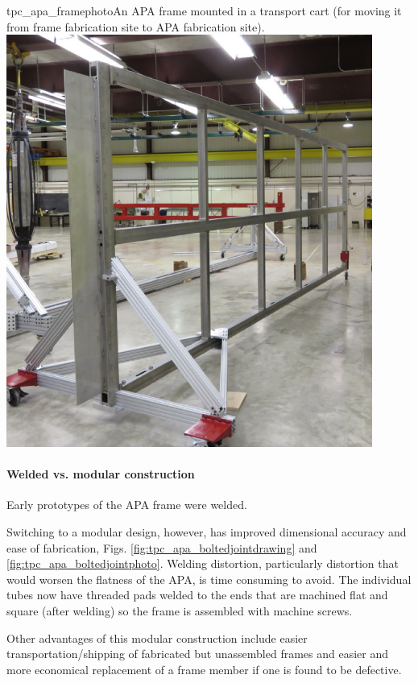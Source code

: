 \begin{cdrfigure}{tpc_apa_framephoto}{An APA frame mounted in a transport cart (for moving it from frame fabrication site to APA fabrication site).}
\includegraphics[width=0.9\textwidth]{figures/tpc_apa_framephoto.png} 
\end{cdrfigure}

\paragraph{Welded vs. modular construction}

Early prototypes of the APA frame were welded.

Switching to a modular design, however, has improved dimensional accuracy and ease of fabrication, Figs. \ref{fig:tpc_apa_boltedjointdrawing} and \ref{fig:tpc_apa_boltedjointphoto}.  Welding distortion, particularly distortion that would worsen the flatness of the APA, is time consuming to avoid.  The individual tubes now have threaded pads welded to the ends that are machined flat and square (after welding) so the frame is assembled with machine screws.

Other advantages of this modular construction include easier transportation/shipping of fabricated but unassembled frames and easier and more economical replacement of a frame member if one is found to be defective.

